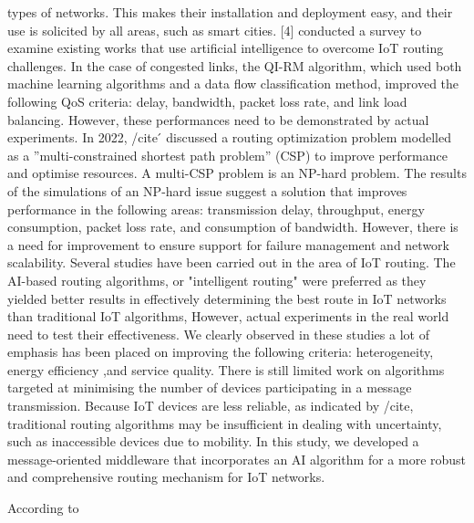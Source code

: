 types of networks. This makes their installation and deployment easy, and their use is solicited by all areas, such as 
smart cities. [4] conducted a survey to examine existing works that use artificial intelligence to overcome IoT routing 
challenges. In the case of congested links, the QI-RM algorithm, which used both machine learning algorithms and a data 
flow classification method, improved the following QoS criteria: delay, bandwidth, packet loss rate, and link load 
balancing. However, these performances need to be demonstrated by actual experiments. In 2022, /cite ́ discussed a routing 
optimization problem modelled as a ”multi-constrained shortest path problem” (CSP) to improve performance and optimise resources.
 A multi-CSP problem is an NP-hard problem. The results of the simulations of an NP-hard issue suggest a solution that improves performance in the following areas: 
transmission delay, throughput, energy consumption, packet loss rate, and consumption of bandwidth. However, 
there is a need for improvement to ensure support for failure management and network scalability. 
Several studies have been carried out in the area of IoT routing. The AI-based routing algorithms, or "intelligent routing"
were preferred as they yielded better results in effectively determining the best route in IoT networks than traditional
IoT algorithms, However, actual experiments in the real world need to test their effectiveness. We clearly observed in 
these studies a lot of emphasis has been placed on improving the following criteria: heterogeneity, energy efficiency
,and service quality. There is still limited work on algorithms targeted at minimising the number of devices 
participating in a message transmission. Because IoT devices are less reliable, as indicated by /cite, traditional routing
algorithms may be insufficient in dealing with uncertainty, such as inaccessible devices due to mobility. 
In this study, we developed a message-oriented middleware that incorporates an AI algorithm for a more robust and 
comprehensive routing mechanism for IoT networks.

According to \cite{plageras-psannis:2017}
